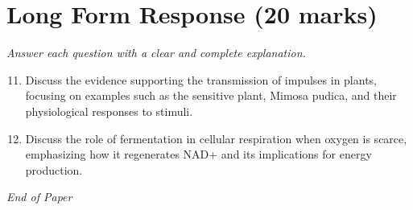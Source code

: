 \documentclass[12pt]{article}
\begin{document}
\section*{Long Form Response (20 marks)}
\textit{Answer each question with a clear and complete explanation.}
\begin{enumerate}[label=\arabic*.]
\setcounter{enumi}{10}
\item Discuss the evidence supporting the transmission of impulses in plants, focusing on examples such as the sensitive plant, Mimosa pudica, and their physiological responses to stimuli.
\item Discuss the role of fermentation in cellular respiration when oxygen is scarce, emphasizing how it regenerates NAD+ and its implications for energy production.
\end{enumerate}

\vfill
\noindent\textit{End of Paper}
\end{document}
